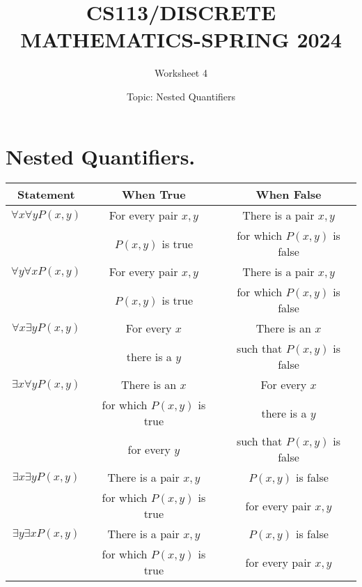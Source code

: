 \documentclass{exam}
\title{CS113/DISCRETE MATHEMATICS-SPRING 2024}
\author{Worksheet 4}
\date{Topic: Nested Quantifiers}
\begin{document}
\maketitle

\begin{center}
\end{center}

\vspace{5mm}

\vspace{5mm}

\section{Nested Quantifiers. }
\vspace{5mm}
\begin{center}
\begin{tabular}{|c|c|c|}
\hline
Statement & When True & When False \\
\hline
$\forall x \forall y P(x, y)$ & For every pair $x, y$ & There is a pair $x, y$ \\
& $P(x, y)$ is true & for which $P(x, y)$ is false \\
\hline
$\forall y \forall x P(x, y)$ & For every pair $x, y$ & There is a pair $x, y$ \\
& $P(x, y)$ is true & for which $P(x, y)$ is false \\
\hline
$\forall x \exists y P(x, y)$ & For every $x$ & There is an $x$ \\
& there is a $y$ & such that $P(x, y)$ is false \\
\hline
$\exists x \forall y P(x, y)$ & There is an $x$ & For every $x$ \\
& for which $P(x, y)$ is true & there is a $y$ \\
& for every $y$ & such that $P(x, y)$ is false \\
\hline
$\exists x \exists y P(x, y)$ & There is a pair $x, y$ & $P(x, y)$ is false \\
& for which $P(x, y)$ is true & for every pair $x, y$ \\
\hline
$\exists y \exists x P(x, y)$ & There is a pair $x, y$ & $P(x, y)$ is false \\
& for which $P(x, y)$ is true & for every pair $x, y$ \\
\hline
\end{tabular}

\end{center}
\vspace{5mm}
\end{document}
